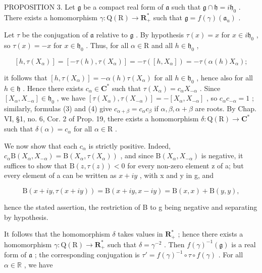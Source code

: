 PROPOSITION 3. Let \(\mathfrak{g}\) be a compact real form of \(\mathfrak{a}\) such that \(\mathfrak{g} \cap \mathfrak{h} = i\mathfrak{h}_0\) . There exists a homomorphism \(\gamma: \mathrm{Q}(\mathrm{R}) \to \mathbf{R}_{+}^{*}\) such that \(\mathfrak{g} = f(\gamma)(\mathfrak{a}_u)\) .

Let \(\tau\) be the conjugation of \(\mathfrak{a}\) relative to \(\mathfrak{g}\) . By hypothesis \(\tau(x) = x\) for \(x \in i\mathfrak{h}_0\) , so \(\tau(x) = -x\) for \(x \in \mathfrak{h}_0\) . Thus, for all \(\alpha \in \mathrm{R}\) and all \(h \in \mathfrak{h}_0\) ,

\[
[ h, \tau (X _ {\alpha}) ] = [ - \tau (h), \tau (X _ {\alpha}) ] = - \tau ([ h, X _ {\alpha} ]) = - \tau (\alpha (h) X _ {\alpha});
\]

it follows that \([h, \tau(X_{\alpha})] = -\alpha(h)\tau(X_{\alpha})\) for all \(h \in \mathfrak{h}_0\) , hence also for all \(h \in \mathfrak{h}\) . Hence there exists \(c_{\alpha} \in \mathbf{C}^*\) such that \(\tau(X_{\alpha}) = c_{\alpha}X_{-\alpha}\) . Since \([X_{\alpha}, X_{-\alpha}] \in \mathfrak{h}_0\) , we have \([\tau(X_{\alpha}), \tau(X_{-\alpha})] = -[X_{\alpha}, X_{-\alpha}]\) , so \(c_{\alpha}c_{-\alpha} = 1\) ; similarly, formulas (3) and (4) give \(c_{\alpha + \beta} = c_{\alpha}c_{\beta}\) if \(\alpha, \beta, \alpha + \beta\) are roots. By Chap. VI, §1, no. 6, Cor. 2 of Prop. 19, there exists a homomorphism \(\delta: \mathrm{Q}(\mathrm{R}) \to \mathbf{C}^*\) such that \(\delta(\alpha) = c_{\alpha}\) for all \(\alpha \in \mathrm{R}\) .

We now show that each \(c_{\alpha}\) is strictly positive. Indeed, \(c_{\alpha}\mathrm{B}(X_{\alpha},X_{-\alpha})=\mathrm{B}(X_{\alpha},\tau(X_{\alpha}))\) , and since \(\mathrm{B}(X_{\alpha},X_{-\alpha})\) is negative, it suffices to show that \(\mathrm{B}(z,\tau(z))<0\) for every non-zero element z of a; but every element of a can be written as \(x+iy\) , with x and y in g, and

\[
\mathrm{B} (x + i y, \tau (x + i y)) = \mathrm{B} (x + i y, x - i y) = \mathrm{B} (x, x) + \mathrm{B} (y, y),
\]

hence the stated assertion, the restriction of B to g being negative and separating by hypothesis.

It follows that the homomorphism \(\delta\) takes values in \(\mathbf{R}_+^*\) ; hence there exists a homomorphism \(\gamma : \mathrm{Q}(\mathrm{R}) \to \mathbf{R}_+^*\) such that \(\delta = \gamma^{-2}\) . Then \(f(\gamma)^{-1}(\mathfrak{g})\) is a real form of \(\mathfrak{a}\) ; the corresponding conjugation is \(\tau' = f(\gamma)^{-1} \circ \tau \circ f(\gamma)\) . For all \(\alpha \in \mathbb{R}\) , we have

